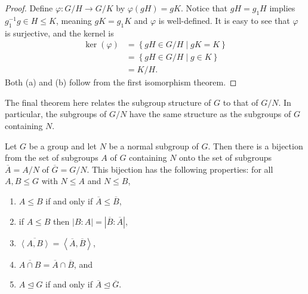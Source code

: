 \documentclass[../m171main.tex]{subfiles}
\begin{document}
\begin{proof}
    Define $\varphi : G / H \to G / K$ by $\varphi(gH) = gK$.
    Notice that $gH = g_1H$ implies $g_1^{-1} g \in H \leq K$, meaning $gK = g_1 K$ and $\varphi$ is well-defined.
    It is easy to see that $\varphi$ is surjective, and the kernel is
    \begin{align*}
        \ker(\varphi) &= \left\{ gH \in G / H \mid gK = K \right\} \\
        &= \left\{ gH \in G / H \mid g \in K \right\} \\
        &= K / H.
    \end{align*}
    Both (a) and (b) follow from the first isomorphism theorem.
\end{proof}

The final theorem here relates the subgroup structure of $G$ to that of $G / N$.
In particular, the subgroups of $G / N$ have the same structure as the subgroups of $G$ containing $N$.

\begin{theorem}
    Let $G$ be a group and let $N$ be a normal subgroup of $G$.
    Then there is a bijection from the set of subgroups $A$ of $G$ containing $N$ onto the set of subgroups $\overline A = A / N$ of $\overline G = G / N$.
    This bijection has the following properties: for all $A,B \leq G$ with $N \leq A$ and $N \leq B$,
    \begin{enumerate}[label=(\alph*),topsep=0pt]
        \item $A \leq B$ if and only if $\overline A \leq \overline B$,
        \item if $A \leq B$ then $|B : A| = |\overline B : \overline A|$,
        \item $\overline{\left< A,B \right>} = \left< \overline A, \overline B \right>$,
        \item $\overline{A \cap B} = \overline A \cap \overline B$, and
        \item $A \trianglelefteq G$ if and only if $\overline A \trianglelefteq \overline G$.
    \end{enumerate}
\end{theorem}

\end{document}
